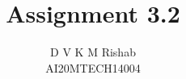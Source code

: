 \documentclass[journal,12pt,twocolumn]{IEEEtran}
\begin{document}
\makeatletter
{}
\makeatother
\let\StandardTheFigure\thefigure
\let\vec\mathbf
\def\putbox#1#2#3{\makebox[0in][l]{\makebox[#1][l]{}\raisebox{\baselineskip}[0in][0in]{\raisebox{#2}[0in][0in]{#3}}}}
     \def\rightbox#1{\makebox[0in][r]{#1}}
     \def\centbox#1{\makebox[0in]{#1}}
     \def\topbox#1{\raisebox{-\baselineskip}[0in][0in]{#1}}
     \def\midbox#1{\raisebox{-0.5\baselineskip}[0in][0in]{#1}}
\vspace{3cm}
\title{Assignment 3.2}
\author{D V K M Rishab \\ AI20MTECH14004}
%
%
%
% 
%
\end{document}
